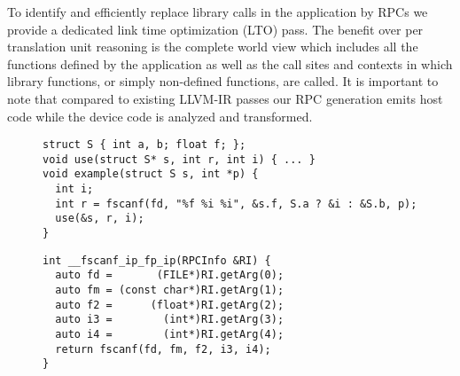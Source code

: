 To identify and efficiently replace library calls in the application by RPCs we provide a dedicated link time optimization (LTO) pass.
The benefit over per translation unit reasoning is the complete world view which includes all the functions defined by the application as well as the call sites and contexts in which library functions, or simply non-defined functions, are called.
It is important to note that compared to existing LLVM-IR passes our RPC generation emits host code while the device code is analyzed and transformed.

\begin{figure}[p]
         
\ContinueLineNumber

\begin{minipage}{\linewidth}
\vspace{2mm}
\begin{lstlisting}[numberfirstline=true, stepnumber=5, frame=lines]
struct S { int a, b; float f; };
void use(struct S* s, int r, int i) { ... }
void example(struct S s, int *p) {
  int i;
  int r = fscanf(fd, "%f %i %i", &s.f, S.a ? &i : &S.b, p);
  use(&s, r, i);
}
\end{lstlisting}
\vspace{-3mm}
\label{fig:rpc_gen_src}
\vspace{3mm}
\end{minipage}

\begin{minipage}{\linewidth}
\begin{lstlisting}[frame=lines]
int __fscanf_ip_fp_ip(RPCInfo &RI) {
  auto fd =       (FILE*)RI.getArg(0);
  auto fm = (const char*)RI.getArg(1);
  auto f2 =      (float*)RI.getArg(2);
  auto i3 =        (int*)RI.getArg(3);
  auto i4 =        (int*)RI.getArg(4);
  return fscanf(fd, fm, f2, i3, i4);
}
\end{lstlisting}
 \vspace{-3mm}
\label{fig:rpc_gen_host}
\vspace{3mm}
\end{minipage}


\end{figure}

